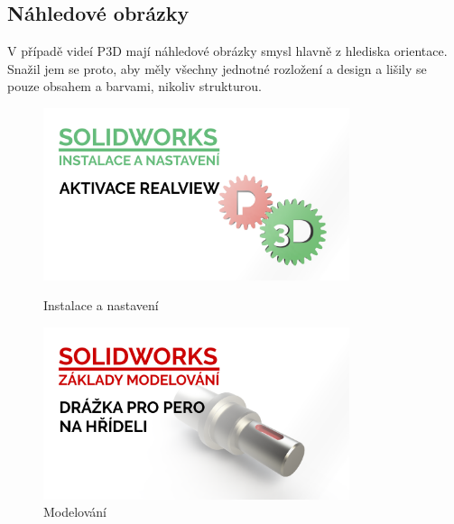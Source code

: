 \subsection{Náhledové obrázky}
V případě videí P3D mají náhledové obrázky smysl hlavně z hlediska orientace.
Snažil jem se proto, aby měly všechny jednotné rozložení a design a lišily se pouze obsahem a barvami, nikoliv strukturou.
\begin{figure}[htbp]
    \centering
    \begin{minipage}[b]{0.45\textwidth}
        \centering
        \includegraphics[width=0.8\textwidth]{img/020/aktivace-realview-thumbnail.png}
        \caption{Instalace a nastavení}
        \label{fig:thumb1}
    \end{minipage}
    \qquad
    \begin{minipage}[b]{0.45\textwidth}
        \centering
        \includegraphics[width=0.8\textwidth]{img/020/perodr-hr-thumbnail.png}
        \caption{Modelování}
        \label{fig:thumb2}
    \end{minipage}
\end{figure}

